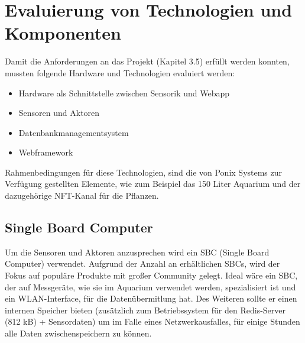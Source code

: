 \section{Evaluierung von Technologien und Komponenten}
\setcounter{page}{27}
Damit die Anforderungen an das Projekt (Kapitel 3.5) erfüllt werden konnten, mussten folgende Hardware und Technologien evaluiert werden:
\begin{itemize}
    \item Hardware als Schnittstelle zwischen Sensorik und Webapp
    \item Sensoren und Aktoren
    \item Datenbankmanagementsystem
    \item Webframework
\end{itemize}
Rahmenbedingungen für diese Technologien, sind die von Ponix Systems zur Verfügung gestellten Elemente, wie zum Beispiel das 150 Liter Aquarium und der dazugehörige \gls{NFT}-Kanal für die Pflanzen.

\subsection{Single Board Computer}
Um die Sensoren und Aktoren anzusprechen wird ein \gls{SBC} (Single Board Computer) verwendet. Aufgrund der Anzahl an erh\"altlichen \gls{SBC}s, wird der Fokus auf popul\"are Produkte mit  gro{\ss}er Community gelegt. Ideal w\"are ein \gls{SBC}, der auf Messger\"ate, wie sie im Aquarium verwendet werden, spezialisiert ist und ein \gls{WLAN}-Interface, f\"ur die Daten\"ubermitlung hat. Des Weiteren sollte er einen internen Speicher bieten (zusätzlich zum Betriebssystem für den Redis-Server (812 kB)\cite{redis_server_xenial} + Sensordaten) um im Falle eines Netzwerkausfalles, f\"ur einige Stunden alle Daten zwischenspeichern zu k\"onnen. 

